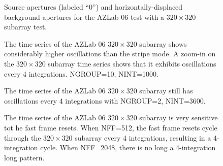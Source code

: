 \documentclass{aastex62}
\begin{document}
\begin{figure}
\caption{Source apertures (labeled ``0'') and horizontally-displaced background apertures for the AZLab 06 test with a $320 \times 320$ subarray test.}\label{fig:sub320AperturesAZlab06}
\end{figure}


\begin{figure}
\caption{The time series of the AZLab 06 $320 \times 320$ subarray shows considerably higher oscillations than the stripe mode.
A zoom-in on the $320 \times 320$ subarray time series shows that it exhibits oscillations every 4 integrations.
NGROUP=10, NINT=1000.
}\label{fig:sub320vsStripeBaseline2}
\end{figure}

\begin{figure}
\caption{The time series of the AZLab 06 $320 \times 320$ subarray still has oscillations every 4 integrations with NGROUP=2, NINT=3600.
}\label{fig:sub320vsStripeBaseline2}
\end{figure}

\begin{figure}
\caption{The time series of the AZLab 06 $320 \times 320$ subarray is very sensitive tot he fast frame resets.
When NFF=512, the fast frame resets cycle through the $320 \times 320$ subarray every 4 integrations, resulting in a 4-integration cycle.
When NFF=2048, there is no long a 4-integration long pattern.
}\label{fig:sub320NFF512vs2048}
\end{figure}
\end{document}
